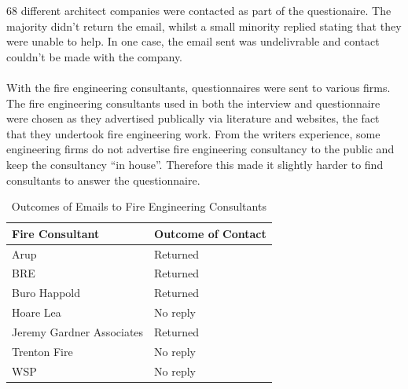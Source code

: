 \documentclass[table,a4paper,oneside]{book}
\begin{document}
68 different architect companies were contacted as part of the questionaire. The majority didn't return the email, whilst a small minority replied stating that they were unable to help. In one case, the email sent was undelivrable and contact couldn't be made with the company.
\\
\\
With the fire engineering consultants, questionnaires were sent to various firms. The fire engineering consultants used in both the interview and questionnaire were chosen as they advertised publically via literature and websites, the fact that they undertook fire engineering work. From the writers experience, some engineering firms do not advertise fire engineering consultancy to the public and keep the consultancy ``in house''. Therefore this made it slightly harder to find consultants to answer the questionnaire.

\begin{table}[htbp]
	\begin{center}
	\begin{tabular}{ll}
		\toprule
		\textbf{Fire Consultant} & \textbf{Outcome of Contact} \\
		\midrule
		Arup	& Returned \\
		BRE	& Returned \\
		Buro Happold	& Returned \\
		Hoare Lea	& No reply \\
		Jeremy Gardner Associates	& Returned \\
		Trenton Fire	& No reply \\
		WSP	& No reply \\
		\bottomrule
	\end{tabular}
	\end{center}
		\caption{Outcomes of Emails to Fire Engineering Consultants}
		\label{tab:Fire_Consultants}
\end{table}
\end{document}
